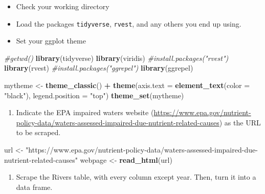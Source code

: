 \documentclass[]{article}
\newenvironment{Shaded}{\begin{snugshade}}{\end{snugshade}}
\newcommand{\CommentTok}[1]{\textcolor[rgb]{0.56,0.35,0.01}{\textit{#1}}}
\newcommand{\DataTypeTok}[1]{\textcolor[rgb]{0.13,0.29,0.53}{#1}}
\newcommand{\KeywordTok}[1]{\textcolor[rgb]{0.13,0.29,0.53}{\textbf{#1}}}
\newcommand{\NormalTok}[1]{#1}
\newcommand{\OperatorTok}[1]{\textcolor[rgb]{0.81,0.36,0.00}{\textbf{#1}}}
\newcommand{\StringTok}[1]{\textcolor[rgb]{0.31,0.60,0.02}{#1}}
\providecommand{\tightlist}{%
  \setlength{\itemsep}{0pt}\setlength{\parskip}{0pt}}
\begin{document}
\begin{itemize}
\tightlist
\item
  Check your working directory
\item
  Load the packages \texttt{tidyverse}, \texttt{rvest}, and any others
  you end up using.
\item
  Set your ggplot theme
\end{itemize}

\begin{Shaded}
\begin{Highlighting}[]
\CommentTok{#getwd()}
\KeywordTok{library}\NormalTok{(tidyverse)}
\KeywordTok{library}\NormalTok{(viridis)}
\CommentTok{#install.packages("rvest")}
\KeywordTok{library}\NormalTok{(rvest)}
\CommentTok{#install.packages("ggrepel")}
\KeywordTok{library}\NormalTok{(ggrepel)}

\NormalTok{mytheme <-}\StringTok{ }\KeywordTok{theme_classic}\NormalTok{() }\OperatorTok{+}
\StringTok{  }\KeywordTok{theme}\NormalTok{(}\DataTypeTok{axis.text =} \KeywordTok{element_text}\NormalTok{(}\DataTypeTok{color =} \StringTok{"black"}\NormalTok{), }
        \DataTypeTok{legend.position =} \StringTok{"top"}\NormalTok{)}
\KeywordTok{theme_set}\NormalTok{(mytheme)}
\end{Highlighting}
\end{Shaded}

\begin{enumerate}
\def\labelenumi{\arabic{enumi}.}
\setcounter{enumi}{1}
\tightlist
\item
  Indicate the EPA impaired waters website
  (\url{https://www.epa.gov/nutrient-policy-data/waters-assessed-impaired-due-nutrient-related-causes})
  as the URL to be scraped.
\end{enumerate}

\begin{Shaded}
\begin{Highlighting}[]
\NormalTok{url <-}\StringTok{ "https://www.epa.gov/nutrient-policy-data/waters-assessed-impaired-due-nutrient-related-causes"}
\NormalTok{webpage <-}\StringTok{ }\KeywordTok{read_html}\NormalTok{(url)}
\end{Highlighting}
\end{Shaded}

\begin{enumerate}
\def\labelenumi{\arabic{enumi}.}
\setcounter{enumi}{2}
\tightlist
\item
  Scrape the Rivers table, with every column except year. Then, turn it
  into a data frame.
\end{enumerate}
\end{document}
